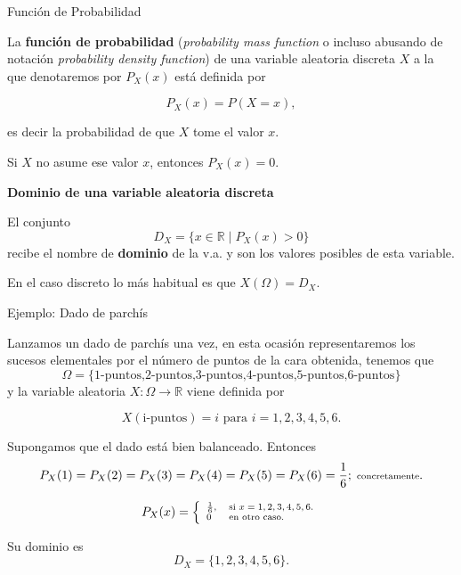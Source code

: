 \documentclass[
  letterpaper,
  DIV=11,
  numbers=noendperiod]{scrreprt}
\begin{document}
\begin{Definicion}{Función de Probabilidad}{}

La \textbf{función de probabilidad} (\emph{probability mass function} o
incluso abusando de notación \emph{probability density function}) de una
variable aleatoria discreta \(X\) a la que denotaremos por \(P_{X}(x)\)
está definida por

\[P_{X}(x)=P(X=x),\]

es decir la probabilidad de que \(X\) tome el valor \(x\).

Si \(X\) no asume ese valor \(x\), entonces \(P_{X}(x)=0\).

\textbf{Dominio de una variable aleatoria discreta}

El conjunto \[D_X=\{ x\in\mathbb{R} \mid P_X(x)>0\}\] recibe el nombre
de \textbf{dominio} de la v.a. y son los valores posibles de esta
variable.

En el caso discreto lo más habitual es que \(X(\Omega)=D_X\).

\end{Definicion}

\begin{Ejemplo}{Ejemplo: Dado de parchís}{}

Lanzamos un dado de parchís una vez, en esta ocasión representaremos los
sucesos elementales por el número de puntos de la cara obtenida, tenemos
que
\[\Omega=\{\mbox{1-puntos,2-puntos,3-puntos,4-puntos,5-puntos,6-puntos}\}\]
y la variable aleatoria \(X:\Omega\to \mathbb{R}\) viene definida por

\[X(\mbox{i-puntos})=i\mbox{ para } i=1,2,3,4,5,6.\]

Supongamos que el dado está bien balanceado. Entonces
\[\scriptsize{P_{X}(1)=P_{X}(2)=P_{X}(3)=P_{X}(4)=P_{X}(5)=P_{X}(6)=\frac16; \mbox{  concretamente}.}\]

\[\scriptsize{
P_{X}(x)=
  \left\{
  \begin{array}{ll}
   \frac16 ,& \mbox{si } x=1,2,3,4,5,6.\\
  0 & \mbox{en otro caso.}
  \end{array}
  \right.}
\]

Su dominio es \[D_X=\{1,2,3,4,5,6\}.\]

\end{Ejemplo}
\end{document}
